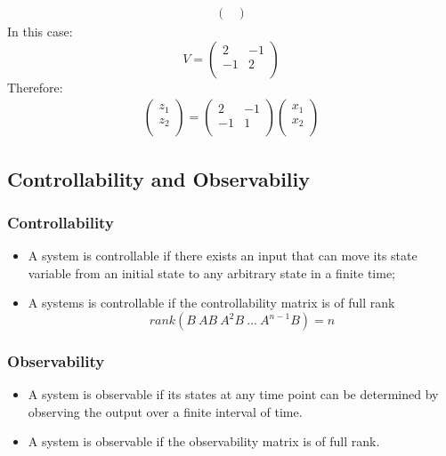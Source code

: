 \begin{ex}{}
\begin{itemize}
\begin{gather*}
\begin{pmatrix}
\end{pmatrix}
\end{gather*}
In this case:
\[V = \begin{pmatrix}
2&-1\\
-1&2\\
\end{pmatrix}\]
Therefore:
\begin{gather*}
\begin{pmatrix}
z_{1}\\
z_{2}\\
\end{pmatrix}
= 
\begin{pmatrix}
2&-1\\
-1&1\\
\end{pmatrix}
\begin{pmatrix}
x_{1}\\
x_{2}\\
\end{pmatrix}
\end{gather*}
\end{itemize}
\end{ex}

\subsection{Controllability and Observabiliy}
\subsubsection{Controllability}
\begin{itemize}
    \item A system is controllable if there exists an input that can move its state variable from an initial state to any arbitrary state in a finite time;
    
    \item A systems is controllable if the controllability matrix is of full rank
    \[rank (B \ AB\ A^{2}B \ ...\ A^{n-1}B)=n\]
\end{itemize}

\subsubsection{Observability}
\begin{itemize}
    \item A system is observable if its states at any time point can be determined by observing the output over a finite interval of time.
    
    \item A system is observable if the observability matrix is of full rank.
\end{itemize}

